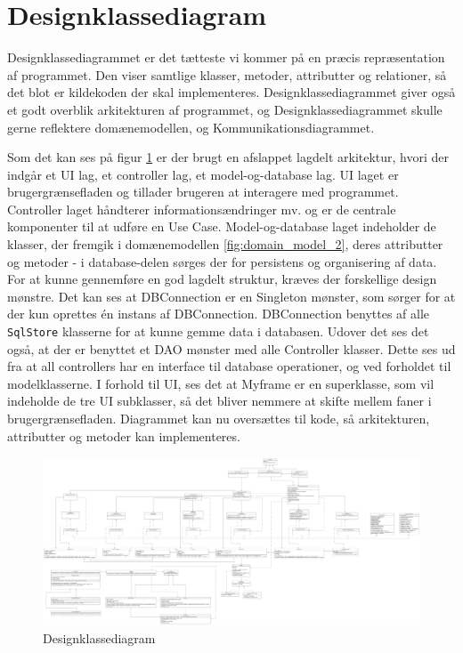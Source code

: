 \section{Designklassediagram}
Designklassediagrammet er det tætteste vi kommer på en præcis repræsentation af programmet. Den viser samtlige klasser, metoder, attributter og relationer, så det blot er kildekoden der skal implementeres. Designklassediagrammet giver også et godt overblik arkitekturen af programmet, og Designklassediagrammet skulle gerne reflektere domænemodellen, og Kommunikationsdiagrammet.

Som det kan ses på figur \ref{fig:designclassdiagram} er der brugt en afslappet lagdelt arkitektur, hvori der indgår et UI lag, et controller lag, et model-og-database lag\cite{Larman2004}. UI laget er brugergrænsefladen og tillader brugeren at interagere med programmet. Controller laget håndterer informationsændringer mv. og er de centrale komponenter til at udføre en Use Case. Model-og-database laget indeholder de klasser, der fremgik i domænemodellen \ref{fig:domain_model_2}, deres attributter og metoder - i database-delen sørges der for persistens og organisering af data. 
For at kunne gennemføre en god lagdelt struktur, kræves der forskellige design mønstre. Det kan ses at DBConnection er en Singleton mønster\cite{Larman2004}, som sørger for at der kun oprettes én instans af DBConnection. DBConnection benyttes af alle \verb|SqlStore| klasserne for at kunne gemme data i databasen. Udover det ses det også, at der er benyttet et DAO mønster\cite{DAO} med alle Controller klasser. Dette ses ud fra at all controllers har en interface til database operationer, og ved forholdet til modelklasserne.
I forhold til UI, ses det at Myframe er en superklasse, som vil indeholde de tre UI subklasser, så det bliver nemmere at skifte mellem faner i brugergrænsefladen.
Diagrammet kan nu oversættes til kode, så arkitekturen, attributter og metoder kan implementeres.

\begin{landscape}
    \begin{figure}
        \centering
        \includegraphics[width=1\hsize]{figures/design/new_designclassdiagram}
        \caption{Designklassediagram}
        \label{fig:designclassdiagram}
    \end{figure}
\end{landscape}

